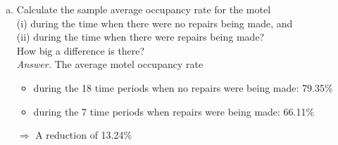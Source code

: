 \documentclass[11pt, xcolor=x11names,compress]{beamer}
\begin{document}
\begin{frame}[fragile,t]
\begin{enumerate}[(f)]
    \item Calculate the sample average occupancy rate for the motel\\
    (i) during the time when there were no repairs being made, and \\
    (ii) during the time when there were repairs being made? \\
    How big a difference is there?\\
    \pause
    \vspace{10mm}
    \textit{Answer.}
    The average motel occupancy rate
    \begin{itemize}
        \item during the 18 time periods when no repairs were being made: 79.35\%
        \item during the 7 time periods when repairs were being made: 66.11\%
    \end{itemize}
 $\Rightarrow$ A reduction of 13.24\%
\end{enumerate}
\end{frame}
\end{document}
